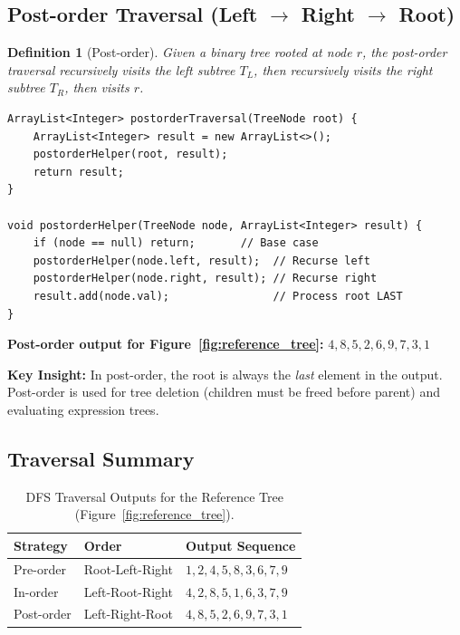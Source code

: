 \documentclass[10pt,journal,compsoc,onecolumn]{IEEEtran}
\newtheorem{definition}[theorem]{Definition}
\begin{document}
\subsection{Post-order Traversal (Left $\to$ Right $\to$ Root)}

\begin{definition}[Post-order]
Given a binary tree rooted at node $r$, the post-order traversal recursively visits the left subtree $T_L$, then recursively visits the right subtree $T_R$, then visits $r$.
\end{definition}

\begin{verbatim}
ArrayList<Integer> postorderTraversal(TreeNode root) {
    ArrayList<Integer> result = new ArrayList<>();
    postorderHelper(root, result);
    return result;
}

void postorderHelper(TreeNode node, ArrayList<Integer> result) {
    if (node == null) return;       // Base case
    postorderHelper(node.left, result);  // Recurse left
    postorderHelper(node.right, result); // Recurse right
    result.add(node.val);                // Process root LAST
}
\end{verbatim}

\textbf{Post-order output for Figure~\ref{fig:reference_tree}:} $4, 8, 5, 2, 6, 9, 7, 3, 1$

\textbf{Key Insight:} In post-order, the root is always the \emph{last} element in the output. Post-order is used for tree deletion (children must be freed before parent) and evaluating expression trees.

\subsection{Traversal Summary}

\begin{table}[htbp]
\centering
\caption{DFS Traversal Outputs for the Reference Tree (Figure~\ref{fig:reference_tree}).}
\label{tab:traversal_outputs}
\begin{tabular}{lll}
\toprule
Strategy & Order & Output Sequence \\
\midrule
Pre-order & Root-Left-Right & $1, 2, 4, 5, 8, 3, 6, 7, 9$ \\
In-order & Left-Root-Right & $4, 2, 8, 5, 1, 6, 3, 7, 9$ \\
Post-order & Left-Right-Root & $4, 8, 5, 2, 6, 9, 7, 3, 1$ \\
\bottomrule
\end{tabular}
\end{table}
\end{document}
